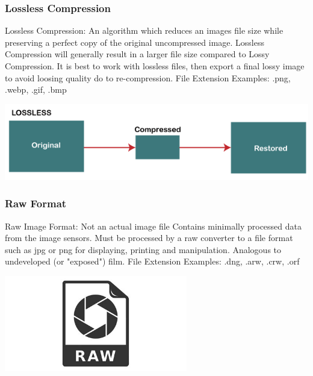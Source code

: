 \documentclass{beamer}
\begin{document}
	\begin{frame}
	\frametitle{Lossless Compression}
	\begin{outline}
		\1 Lossless Compression:
		\2 An algorithm which reduces an images file size while preserving a perfect copy of the original uncompressed image.  
		\2 Lossless Compression will generally result in a larger file size compared to Lossy Compression.  
		\2 It is best to work with lossless files, then export a final lossy image to avoid loosing quality do to re-compression.
		\1 File Extension Examples:  
		\2 .png, .webp, .gif, .bmp
	\end{outline}
	\begin{center}
		\includegraphics[width = 1.0\textwidth]{images/lossless compression.png}
	\end{center}
\end{frame}

	\begin{frame}
	\frametitle{Raw Format}
	\begin{outline}
		\1 Raw Image Format:  
		\2 Not an actual image file
		\2 Contains minimally processed data from the image sensors.
		\2 Must be processed by a raw converter to a file format such as jpg or png for displaying, printing and manipulation.
		\1 Analogous to undeveloped (or "exposed") film.  
		\1 File Extension Examples:  
		\2 .dng, .arw, .crw, .orf
		\end{outline}
	\begin{center}
		\includegraphics[width = 0.6\textwidth]{images/raw.jpg}
	\end{center}
\end{frame}
\end{document}

